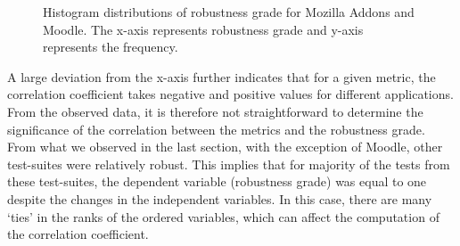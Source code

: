 \begin{figure}[htb!] 
\centering     %
{}
  \captionsetup{justification=justified,
singlelinecheck=false}
\caption{Histogram distributions of robustness grade for Mozilla Addons and Moodle. The x-axis represents robustness grade and y-axis represents the frequency.}
\label{fig:hist}
\end{figure} 

A large deviation from the x-axis further indicates that for a given metric, the correlation coefficient takes negative and positive values for different applications. From the observed data, it is therefore not straightforward to determine the significance of the correlation between the metrics and the robustness grade. From what we observed in the last section, with the exception of Moodle, other test-suites were relatively robust. This implies that for majority of the tests from these test-suites, the dependent variable (robustness grade) was equal to one despite the changes in the independent variables. In this case, there are many `ties' in the ranks of the ordered variables, which can affect the computation of the correlation coefficient. 

